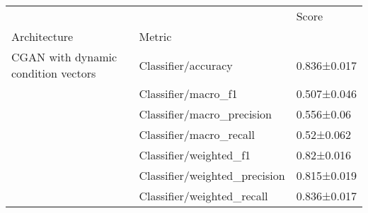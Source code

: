 \begin{tabular}{lll}
\toprule
                                    &                            &        Score \\
Architecture & Metric &              \\
\midrule
CGAN with dynamic condition vectors & Classifier/accuracy &  0.836±0.017 \\
                                    & Classifier/macro\_f1 &  0.507±0.046 \\
                                    & Classifier/macro\_precision &   0.556±0.06 \\
                                    & Classifier/macro\_recall &   0.52±0.062 \\
                                    & Classifier/weighted\_f1 &   0.82±0.016 \\
                                    & Classifier/weighted\_precision &  0.815±0.019 \\
                                    & Classifier/weighted\_recall &  0.836±0.017 \\
\bottomrule
\end{tabular}
